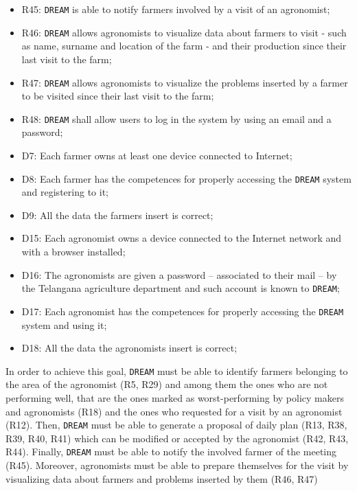 \documentclass{article}
\begin{document}
\begin{itemize}
    \item R45: \verb|DREAM| is able to notify farmers involved by a visit of an agronomist;
    
    \item R46: \verb|DREAM| allows agronomists to visualize data about farmers to visit - such as name, surname and location of the farm -  and their production since their last visit to the farm;
    
    \item R47: \verb|DREAM| allows agronomists to visualize the problems inserted by a farmer to be visited since their last visit to the farm;
    
    \item R48: \verb|DREAM| shall allow users to log in the system by using an email and a password;
    
    \item D7: Each farmer owns at least one device connected to Internet;
    
    \item D8: Each farmer has the competences for properly accessing the \verb|DREAM| system and registering to it;
    
    \item D9: All the data the farmers insert is correct;
    
    \item D15: Each agronomist owns a device connected to the Internet network and with a browser installed;

    \item D16: The agronomists are given a password – associated to their mail – by the Telangana agriculture department and such account is known to \verb|DREAM|;

    \item D17: Each agronomist has the competences for properly accessing the \verb|DREAM| system and using it;
  
    \item D18: All the data the agronomists insert is correct;
\end{itemize}
In order to achieve this goal, \verb|DREAM| must be able to identify farmers belonging to the area of the agronomist (R5, R29) and among them the ones who are not performing well, that are the ones marked as worst-performing by policy makers and agronomists (R18) and the ones who requested for a visit by an agronomist (R12). Then, \verb|DREAM| must be able to generate a proposal of daily plan (R13, R38, R39, R40, R41) which can be modified or accepted by the agronomist (R42, R43, R44). Finally, \verb|DREAM| must be able to notify the involved farmer of the meeting (R45). Moreover, agronomists must be able to prepare themselves for the visit by visualizing data about farmers and problems inserted by them (R46, R47)
\end{document}
